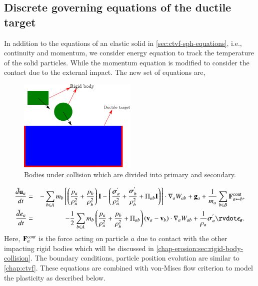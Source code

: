 \subsection{Discrete governing equations of the ductile target}
\label{chap-erosion:sec:discrete-governing-equations}
In addition to the equations of an elastic solid in
\cref{sec:ctvf-sph-equations}, i.e., continuity and momentum, we consider
energy equation to track the temperature of the solid particles. While the
momentum equation is modified to consider the contact due to the external
impact. The new set of equations are,
\begin{figure}[!htpb]
  \centering
  \includegraphics[width=0.5\textwidth]{images/erosion/images/intro/intro_description}
  \caption{Bodies under collision which are divided into primary and
    secondary.}
\label{fig:bodies_under_collision}
\end{figure}
\begin{eqnarray}
\label{eqn:erosion-sph-momentum}
  \frac{\tilde{d}\ten{u}_{a}}{dt} &=& - \sum_{b \in A} m_b \left[
  \left(\frac{p_a}{\rho_a^2} + \frac{p_b}{\rho_b^2}\right) \ten{I} -
  \left(\frac{\teng{\sigma}^{'}_{a}}{\rho_a^2} +
  \frac{\teng{\sigma}^{'}_{b}}{\rho_b^2} + \Pi_{ab} \ten{I} \right) \right]  \cdot \nabla_{a} W_{ab} +
  \ten{g}_{a} + \frac{1}{m_a}\sum_{b \in B} \ten{F}^{\text{cont}}_{a \leftarrow b},\\
  \frac{\tilde{d}{e}_{a}}{dt} &=& - \frac{1}{2} \sum_{b \in A} m_b
  \left(\frac{p_a}{\rho_a^2} + \frac{p_b}{\rho_b^2} + \Pi_{ab} \right)
  \left( \ten{v}_a - \ten{v}_b \right) \cdot \nabla_{a} W_{ab} +
  \frac{1}{\rho_a} \teng{\sigma}^{'}_{a} \rvdot \teng{\epsilon_a}.
\end{eqnarray}
Here, $\mathbf{F}^{cont}_{a}$ is the force acting on particle $a$ due to contact
with the other impacting rigid bodies which will be discussed in
\cref{chap-erosion:sec:rigid-body-collision}. The boundary conditions, particle position
evolution are similar to \cref{chap:ctvf}. These equations are combined
with von-Mises flow criterion to model the plasticity as described below.

